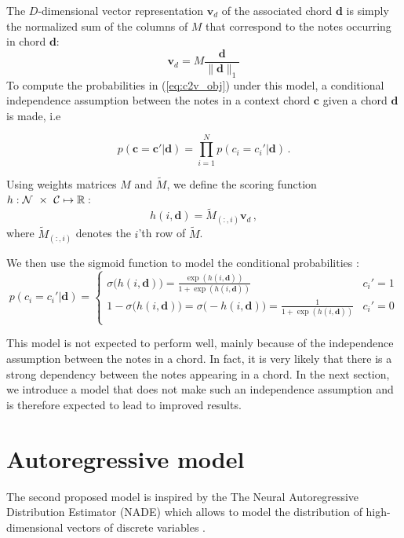 \documentclass[12pt]{article}\pagestyle{myheadings}
\newcommand{\M}{\tilde{M}}
\newcommand{\boldc}{\boldsymbol c}
\newcommand{\boldd}{\boldsymbol d}
\newcommand{\boldvd}{\boldsymbol v_d}
\begin{document}
The $D$-dimensional vector representation $\boldvd$ of the associated chord $\boldd$ is simply the normalized sum of the columns of $M$ that correspond to the notes occurring in chord $\boldd$:
\[ \boldvd = M\frac{ \boldd}{\| \boldd \|_1}
\]
To compute the probabilities in (\ref{eq:c2v_obj}) under this model, a  conditional independence assumption between the notes in a context chord $\boldc$ given a chord $\boldd$ is made, i.e 

\begin{equation}
p(\boldc =\boldc' | \boldd) = \prod_{i=1}^N  p(c_i =c_i'|  \boldd) \,.
\end{equation} 

\noindent Using weights matrices $M$ and $\M$, we define the scoring function $\nobreak{h: \mathcal{N}~\times~\mathcal{C}\mapsto\mathbb{R} :}$
\begin{equation}
h(i,\boldd) =  \M_{(:,i)} \boldvd \,,
\end{equation}
where $\M_{(:,i)}$ denotes the $i$'th row of $\M$.

\noindent
We then use the sigmoid function to model the conditional probabilities :
\begin{equation}
p(c_i =c_i'|  \boldd) = \left\{
                \begin{array}{lll}
                  \sigma\big( h(i,\boldd) \big) = \frac{\exp(h(i,\boldd))}{1 + \exp(h(i,\boldd))} & c_i' = 1 \\
                  1- \sigma\big( h(i,\boldd) \big) = \sigma\big( - h(i,\boldd) \big) = \frac{1}{1 + \exp(h(i,\boldd))} & c_i' = 0\\
                \end{array}
              \right.
\end{equation}

This model is not expected to perform well, mainly because of the independence assumption between the notes in a chord. In fact, it is very likely that there is a strong dependency between the notes appearing in a chord. In the next section, we introduce a model that does not make such an independence assumption and is therefore expected to lead to improved results. 

\section*{Autoregressive model}

The second proposed model is inspired by the The Neural Autoregressive Distribution Estimator (NADE) which allows to model the distribution of high-dimensional vectors of discrete variables \citep{larochelle2011}.
\end{document}

